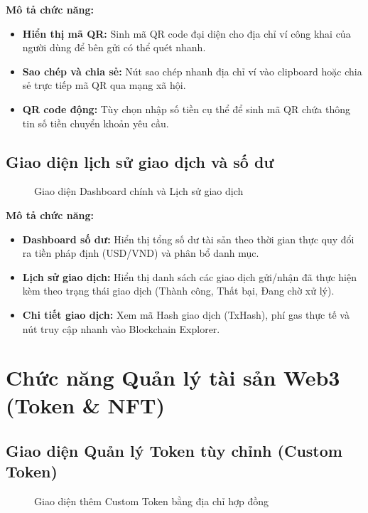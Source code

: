 \documentclass[a4paper]{report}
\begin{document}
\textbf{Mô tả chức năng:}
\begin{itemize}
    \item \textbf{Hiển thị mã QR:} Sinh mã QR code đại diện cho địa chỉ ví công khai của người dùng để bên gửi có thể quét nhanh.
    \item \textbf{Sao chép và chia sẻ:} Nút sao chép nhanh địa chỉ ví vào clipboard hoặc chia sẻ trực tiếp mã QR qua mạng xã hội.
    \item \textbf{QR code động:} Tùy chọn nhập số tiền cụ thể để sinh mã QR chứa thông tin số tiền chuyển khoản yêu cầu.
\end{itemize}

\subsection{Giao diện lịch sử giao dịch và số dư}
\begin{figure}[h]
    \centering
    \caption{Giao diện Dashboard chính và Lịch sử giao dịch}
    \label{fig:ui_dashboard}
\end{figure}

\textbf{Mô tả chức năng:}
\begin{itemize}
    \item \textbf{Dashboard số dư:} Hiển thị tổng số dư tài sản theo thời gian thực quy đổi ra tiền pháp định (USD/VND) và phân bổ danh mục.
    \item \textbf{Lịch sử giao dịch:} Hiển thị danh sách các giao dịch gửi/nhận đã thực hiện kèm theo trạng thái giao dịch (Thành công, Thất bại, Đang chờ xử lý).
    \item \textbf{Chi tiết giao dịch:} Xem mã Hash giao dịch (TxHash), phí gas thực tế và nút truy cập nhanh vào Blockchain Explorer.
\end{itemize}

\section{Chức năng Quản lý tài sản Web3 (Token \& NFT)}

\subsection{Giao diện Quản lý Token tùy chỉnh (Custom Token)}
\begin{figure}[h]
    \centering
    \caption{Giao diện thêm Custom Token bằng địa chỉ hợp đồng}
    \label{fig:ui_custom_token}
\end{figure}
\end{document}
